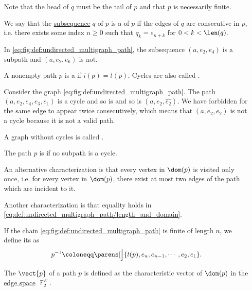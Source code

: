\begin{definition}
\begin{thmenum}
    Note that the head of \( q \) must be the tail of \( p \) and that \( p \) is necessarily finite.

     We say that the \hyperref[def:sequence]{subsequence} \( q \) of \( p \) is a  of \( p \) if the edges of \( q \) are consecutive in \( p \), i.e. there exists some index \( n \geq 0 \) such that \( q_k = e_{n + k} \) for \( 0 < k < \len(q) \).

    In \eqref{eq:fig:def:undirected_multigraph_path}, the subsequence \( (a, e_2, e_4) \) is a subpath and \( (a, e_2, e_6) \) is not.

     A nonempty path \( p \) is a  if \( i(p) = t(p) \). Cycles are also called .

    Consider the graph \eqref{eq:fig:def:undirected_multigraph_path}. The path \( (a, e_2, e_4, e_3, e_1) \) is a cycle and so is and so is \( (a, e_2, \widehat{e_2}) \). We have forbidden for the same edge to appear twice consecutively, which means that \( (a, e_2, e_2) \) is not a cycle because it is not a valid path.

    A graph without cycles is called .

     The path \( p \) is  if no subpath is a cycle.

    An alternative characterization is that every vertex in \( \dom(p) \) is visited only once, i.e. for every vertex in \( \dom(p) \), there exist at most two edges of the path which are incident to it.

    Another characterization is that equality holds in \eqref{eq:def:undirected_multigraph_path/length_and_domain}.

     If the chain \eqref{eq:fig:def:undirected_multigraph_path} is finite of length \( n \), we define its  as
    \begin{equation*}
      p^{-1} \coloneqq \parens[\Big]{ t(p), e_n, e_{n-1}, \cdots, e_2, e_1 }.
    \end{equation*}

     The  \( \vect{p} \) of a path \( p \) is defined as the characteristic vector of \( \dom(p) \) in the \hyperref[def:hypergraph_vector_spaces/edge]{edge space} \( \BbbF_2^E \).
  \end{thmenum}
\end{definition}

